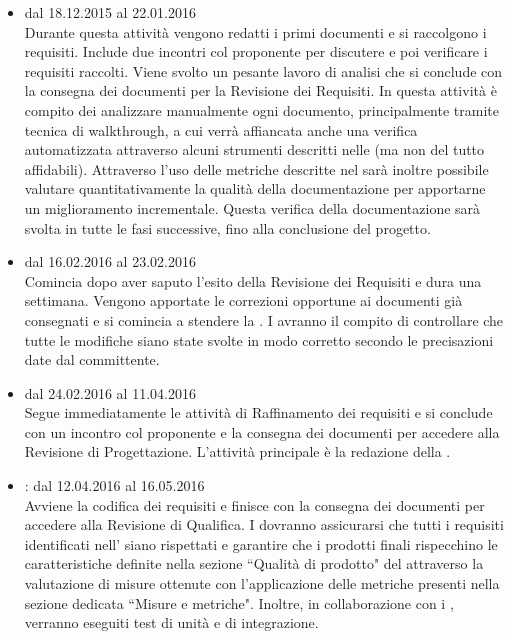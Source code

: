 \documentclass[a4paper, titlepage]{article}
\begin{document}
	\begin{itemize}
		\item {} dal 18.12.2015 al 22.01.2016\\
		Durante questa attività vengono redatti i primi documenti e  si raccolgono i requisiti. Include due incontri col proponente per discutere e poi verificare i requisiti raccolti. Viene svolto un pesante lavoro di analisi che si conclude con la consegna dei documenti per la Revisione dei Requisiti. In questa attività è compito dei  analizzare manualmente ogni documento, principalmente tramite tecnica di walkthrough, a cui verrà affiancata anche una verifica automatizzata attraverso alcuni strumenti descritti nelle  (ma non del tutto affidabili).
		Attraverso l'uso delle metriche descritte nel  sarà inoltre possibile valutare quantitativamente la qualità della documentazione per apportarne un miglioramento incrementale. Questa verifica della documentazione sarà svolta in tutte le fasi successive, fino alla conclusione del progetto.
		
		\item {} dal 16.02.2016 al 23.02.2016\\
		Comincia dopo aver saputo l'esito della Revisione dei Requisiti e dura  una settimana. Vengono apportate le correzioni opportune ai documenti già consegnati e si comincia a stendere la . I  avranno il compito di controllare che tutte le modifiche siano state svolte in modo corretto secondo le precisazioni date dal committente.
		
		\item {} dal 24.02.2016 al 11.04.2016\\
		Segue immediatamente le attività di Raffinamento dei requisiti e si conclude con un incontro col proponente e la consegna dei documenti per accedere alla Revisione di Progettazione. L'attività principale è la redazione della .
		
		\item {}: dal 12.04.2016 al 16.05.2016\\
		Avviene la codifica dei requisiti e finisce con la consegna dei documenti per accedere alla Revisione di Qualifica. I  dovranno assicurarsi che tutti i requisiti identificati nell' siano rispettati e garantire che i prodotti finali rispecchino le caratteristiche definite nella sezione ``Qualità di prodotto" del  attraverso la valutazione di misure ottenute con l'applicazione delle metriche presenti nella sezione dedicata ``Misure e metriche". Inoltre, in collaborazione con i , verranno eseguiti test di unità e di integrazione.
		

\end{itemize}
\end{document}
